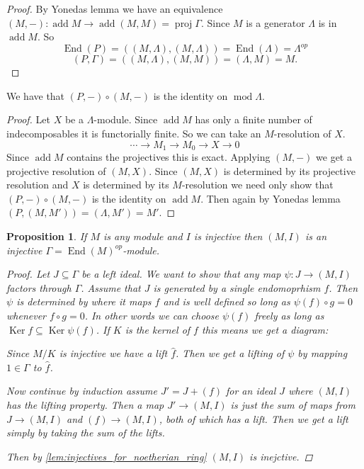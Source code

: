 \documentclass[11pt, a4paper, english]{article}
\newtheorem{prop}[theorem]{Proposition}
\theoremstyle{definition}
\DeclareMathOperator{\End}{End}
\DeclareMathOperator{\Ker}{Ker}
\DeclareMathOperator{\proj}{proj}
\DeclareMathOperator{\add}{add}
\def\mod{\operatorname{mod}}
\begin{document}
\begin{proof}
	By Yonedas lemma we have an equivalence $(M,-):\add M \to \add (M,M)=\proj\Gamma$. Since $M$ is a generator $\Lambda$ is in $\add M$. So $$\End(P)=((M,\Lambda), (M,\Lambda)) = \End(\Lambda)=\Lambda^{op}$$  $$(P,\Gamma)=((M,\Lambda),(M,M))=(\Lambda,M)=M.$$
\end{proof}

We have that $(P,-)\circ (M,-)$ is the identity on $\mod\Lambda$.

\begin{proof}
	Let $X$ be a $\Lambda$-module. Since $\add M$ has only a finite number of indecomposables it is functorially finite. So we can take an $M$-resolution of $X$.
	$$\cdots \to M_1 \to M_0 \to X \to 0$$
	Since $\add M$ contains the projectives this is exact. Applying $(M,-)$ we get a projective resolution of $(M,X)$. Since $(M, X)$ is determined by its projective resolution and $X$ is determined by its $M$-resolution we need only show that $(P,-)\circ (M,-)$ is the identity on $\add M$. Then again by Yonedas lemma $(P, (M, M')) = (\Lambda, M')=M'$.
\end{proof}

\begin{prop}\label{prop:hom_preserves_injectives}
	If $M$ is any module and $I$ is injective then $(M,I)$ is an injective $\Gamma=\End(M)^{op}$-module.
	\begin{proof}
		Let $J \subseteq \Gamma$ be a left ideal. We want to show that any map $\psi:J \to (M,I)$ factors through $\Gamma$. Assume that $J$ is generated by a single endomoprhism $f$. Then $\psi$ is determined by where it maps $f$ and is well defined so long as $\psi(f)\circ g = 0$ whenever $f\circ g=0$. In other words we can choose $\psi(f)$ freely as long as $\Ker f \subseteq \Ker \psi(f)$. If $K$ is the kernel of $f$ this means we get a diagram:
		\begin{center}
		\end{center}
		Since $M/K$ is injective we have a lift $\hat{f}$. Then we get a lifting of $\psi$ by mapping $1\in\Gamma$ to $\hat{f}$.
		
		Now continue by induction assume $J' = J + (f)$ for an ideal $J$ where $(M, I)$ has the lifting property. Then a map $J' \to (M,I)$ is just the sum of maps from $J \to (M, I)$ and $(f) \to (M,I)$, both of which has a lift. Then we get a lift simply by taking the sum of the lifts.
		
		Then by \cref{lem:injectives_for_noetherian_ring} $(M, I)$ is inejctive.
	\end{proof}
\end{prop}
\end{document}
